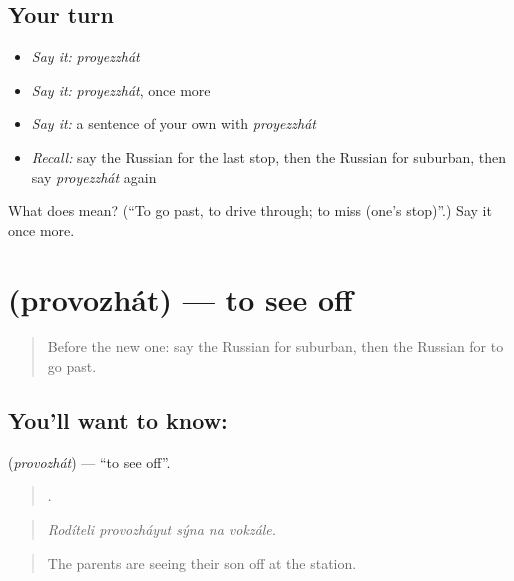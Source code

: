 \subsection*{Your turn}
\begin{itemize}
\raggedright
  \item \emph{Say it:} \emph{proyezzhát}
  \item \emph{Say it:} \emph{proyezzhát}, once more
  \item \emph{Say it:} a sentence of your own with \emph{proyezzhát}
  \item \emph{Recall:} say the Russian for the last stop, then the Russian for suburban, then say \emph{proyezzhát} again
\end{itemize}

\begin{tcolorbox}[breakable,colback=teal!4,colframe=teal!35!black,title={Before you move on}]
What does  mean? (\textquotedblleft{}To go past, to drive through; to miss (one's stop)\textquotedblright{}.) Say it once more.
\end{tcolorbox}
\section[\texorpdfstring{\ru{провожать} (provozhát)}{провожать (provozhát)}]{ (provozhát) — to see off}

\label{lesson:RU-C418-provozhat}



\begin{quote}
Before the new one: say the Russian for suburban, then the Russian for to go past.
\end{quote}

\subsection*{You'll want to know: }
\textbf{} (\emph{provozhát}) — \textquotedblleft{}to see off\textquotedblright{}.

\begin{quote}
    .
\end{quote}

\begin{quote}
\emph{Rodíteli provozháyut sýna na vokzále.}
\end{quote}

\begin{quote}
The parents are seeing their son off at the station.
\end{quote}

